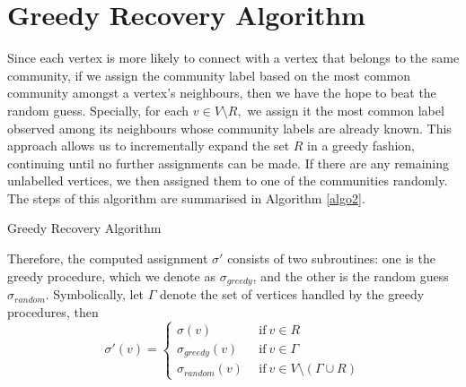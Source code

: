\section{Greedy Recovery Algorithm}
Since each vertex is more likely to connect with a vertex that belongs to the same community, if we assign the community label based on the most common community amongst a vertex's neighbours, then we have the hope to beat the random guess. Specially, for each $v\in V\setminus R,$ we assign it the most common label observed among its neighbours whose community labels are already known. This approach allows us to incrementally expand the set $R$ in a greedy fashion, continuing until no further assignments can be made. If there are any remaining unlabelled vertices, we then assigned them to one of the communities randomly. The steps of this algorithm are summarised in Algorithm \ref{algo2}.\\
\begin{algorithm}[H]\label{algo2} 

\BlankLine
\caption{Greedy Recovery Algorithm}
\end{algorithm}
Therefore, the computed assignment $\sigma'$ consists of two subroutines: one is the greedy procedure, which we denote as $\sigma_{greedy}$, and the other is the random guess $\sigma_{random}$. Symbolically, let $\Gamma$ denote the set of vertices handled by the greedy procedures, then \begin{equation}\label{equn:3.1}
    \sigma'(v)=\begin{cases}
    \sigma(v)~&~\text{if}~v\in R\\
    \sigma_{greedy}(v)~&~\text{if}~v\in \Gamma\\
    \sigma_{random}(v)~&~\text{if}~v\in V\setminus(\Gamma\cup R)
    \end{cases}
\end{equation}
